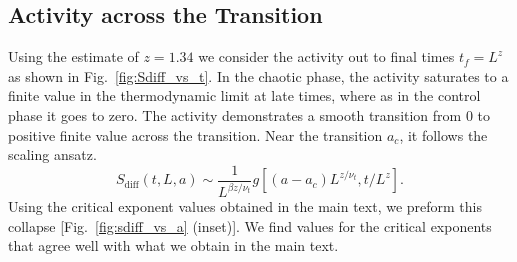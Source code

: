 \documentclass[twocolumn,amsmath,amssymb,floatfix,superscriptaddress,aps,prl]{revtex4-2}
\begin{document}
{%
%



\subsection{Activity across the Transition}



Using the estimate of $z=1.34$ we consider the activity out to final times $t_f=L^z$ as shown in Fig.~\ref{fig:Sdiff_vs_t}. In the chaotic phase, the activity saturates to a finite value in the thermodynamic limit at late times, where as in the control phase it goes to zero. The activity demonstrates a smooth transition from $0$ to positive finite value across the transition. Near the transition $a_c$, it follows the scaling ansatz.
\begin{equation}
    S_{\mathrm{diff}}(t,L,a)\sim \frac{1}{L^{\beta z/\nu_t}}g\left[(a-a_c)L^{z/\nu_t},t/L^z\right].
    \label{eqn:Sdiffscaling}
\end{equation}
Using the critical exponent values obtained in the main text, we preform this collapse [Fig.~\ref{fig:sdiff_vs_a} (inset)]. We find values for the critical exponents that agree well with what we obtain in the main text.

}
\end{document}
